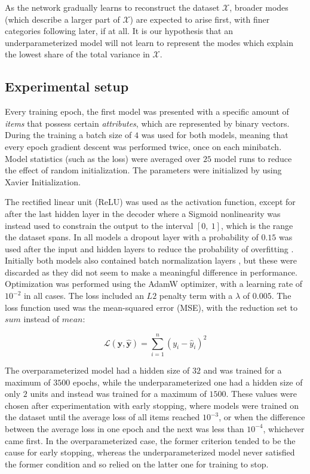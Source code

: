 \documentclass[11pt]{article}
\theoremstyle{remark}
\begin{document}
As the network gradually learns to reconstruct the dataset $\mathcal{X}$, broader modes (which describe a larger part of $\mathcal{X}$) are expected to arise first, with finer categories following later, if at all. It is our hypothesis that an underparameterized model will not learn to represent the modes which explain the lowest share of the total variance in $\mathcal{X}$.

\subsection{Experimental setup}

Every training epoch, the first model was presented with a specific amount of \textit{items} that possess certain \textit{attributes}, which are represented by binary vectors. During the training a batch size of $4$ was used for both models, meaning that every epoch gradient descent was performed twice, once on each minibatch. Model statistics (such as the loss) were averaged over $25$ model runs to reduce the effect of random initialization. The parameters were initialized by using Xavier Initialization.

The rectified linear unit (ReLU) was used as the activation function, except for after the last hidden layer in the decoder where a Sigmoid nonlinearity was instead used to constrain the output to the interval $[0,\ 1]$, which is the range the dataset spans. In all models a dropout layer with a probability of $0.15$ was used after the input and hidden layers to reduce the probability of overfitting \cite{dropout}. Initially both models also contained batch normalization layers \cite{batch_norm}, but these were discarded as they did not seem to make a meaningful difference in performance. Optimization was performed using the AdamW optimizer, with a learning rate of $10^{-2}$ in all cases. The loss included an $L2$ penalty term with a $\lambda$ of $0.005$. The loss function used was the mean-squared error (MSE), with the reduction set to $sum$ instead of $mean$:

\begin{equation}
  \mathcal{L}(\bm{y}, \bm{\hat{y}}) = \sum_{i=1}^n (y_i - \hat{y}_i)^2
\end{equation}

\noindent The overparameterized model had a hidden size of $32$ and was trained for a maximum of $3500$ epochs, while the underparameterized one had a hidden size of only $2$ units and instead was trained for a maximum of $1500$. These values were chosen after experimentation with early stopping, where models were trained on the dataset until the average loss of all items reached $10^{-3}$, or when the difference between the average loss in one epoch and the next was less than $10^{-4}$, whichever came first. In the overparameterized case, the former criterion tended to be the cause for early stopping, whereas the underparameterized model never satisfied the former condition and so relied on the latter one for training to stop.
\end{document}
